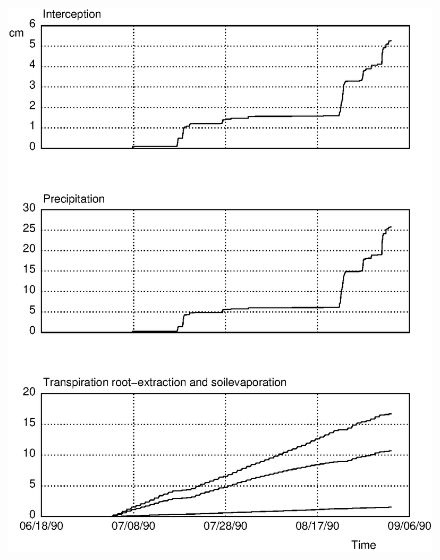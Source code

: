 \begin{figure}
\centerline{
\includegraphics{psfig/watbal2.eps}
}
\label{fig:watbal2}
\caption{}
\end{figure}


